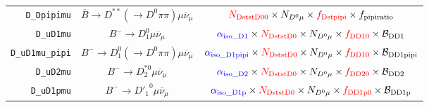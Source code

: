 \begin{landscape}
\begin{table}
\begin{tabular}{r|c|c}
      \texttt{D\_Dpipimu} &  $\overline{B} \rightarrow D^{**} (\rightarrow D^0 \pi\pi) \mu \overline{\nu}_\mu$   &                                                                                                                          $\textcolor{red}{N_\text{DststD00}} \times N_{D^0 \mu} \times \textcolor{red}{f_\text{Dstpipi}} \times f_\text{pipiratio}$                                                                                                                           \\
        \texttt{D\_uD1mu} &                    $B^- \rightarrow D_1^0 \mu \overline{\nu}_\mu$                    &                                                                                                   $\textcolor{blue}{\alpha_\text{iso\_D1}} \times \textcolor{red}{N_\text{DststD0}} \times N_{D^0 \mu} \times \textcolor{red}{f_\text{DD10}} \times \mathcal{B}_\text{DD1}$                                                                                                   \\
  \texttt{D\_uD1mu\_pipi} &       $B^- \rightarrow D_1^0 (\rightarrow D^0 \pi\pi) \mu \overline{\nu}_\mu$        &                                                                                               $\textcolor{blue}{\alpha_\text{iso\_D1pipi}} \times \textcolor{red}{N_\text{DststD0}} \times N_{D^0 \mu} \times \textcolor{red}{f_\text{DD10}} \times \mathcal{B}_\text{DD1pipi}$                                                                                               \\
        \texttt{D\_uD2mu} &                  $B^- \rightarrow D_2^{*0} \mu \overline{\nu}_\mu$                   &                                                                                                   $\textcolor{blue}{\alpha_\text{iso\_D2}} \times \textcolor{red}{N_\text{DststD0}} \times N_{D^0 \mu} \times \textcolor{red}{f_\text{DD20}} \times \mathcal{B}_\text{DD2}$                                                                                                   \\
       \texttt{D\_uD1pmu} &                  $B^- \rightarrow {D'_1}^0 \mu \overline{\nu}_\mu$                   &                                                                                                 $\textcolor{blue}{\alpha_\text{iso\_D1p}} \times \textcolor{red}{N_\text{DststD0}} \times N_{D^0 \mu} \times \textcolor{red}{f_\text{DD1p0}} \times \mathcal{B}_\text{DD1p}$                                                                                                  \\

\end{tabular}
\end{table}
\end{landscape}
